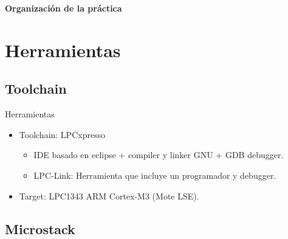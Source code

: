 \documentclass[aspectratio=169]{beamer}
\begin{document}

\begin{frame}{\textbf{Organización de la práctica}}
  \tableofcontents
\end{frame}
%
%
\section[Herramientas]{Herramientas}

\subsection{Toolchain}

\begin{frame}[t]{Herramientas}
\vspace{10px}
    \begin{itemize}
        \item Toolchain: LPCxpresso
        \vspace{20px}
            \begin{itemize}
            \item IDE basado en eclipse + compiler y linker GNU + GDB debugger.
            \vspace{10px}
            \item LPC-Link: Herramienta que incluye un programador y debugger.
            \vspace{10px}   
            \end{itemize}
        \vspace{20px}
        \item Target: LPC1343 ARM Cortex-M3 (Mote LSE).
	\end{itemize}
\end{frame}

\subsection{Microstack}
\end{document}
